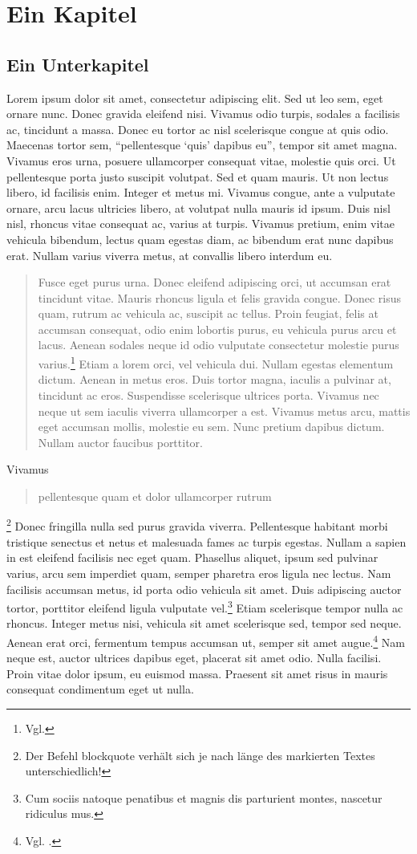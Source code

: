 \chapter{Ein Kapitel}
\section{Ein Unterkapitel}
Lorem ipsum dolor sit amet, consectetur adipiscing elit. Sed ut leo sem, eget ornare nunc. Donec gravida eleifend nisi. Vivamus odio turpis, sodales a facilisis ac, tincidunt a massa. Donec eu tortor ac nisl scelerisque congue at quis odio. Maecenas tortor sem, \enquote{pellentesque \enquote{quis} dapibus eu}, tempor sit amet magna. Vivamus eros urna, posuere ullamcorper consequat vitae, molestie quis orci. Ut pellentesque porta justo suscipit volutpat. Sed et quam mauris. Ut non lectus libero, id facilisis enim. Integer et metus mi. Vivamus congue, ante a vulputate ornare, arcu lacus ultricies libero, at volutpat nulla mauris id ipsum. Duis nisl nisl, rhoncus vitae consequat ac, varius at turpis. Vivamus pretium, enim vitae vehicula bibendum, lectus quam egestas diam, ac bibendum erat nunc dapibus erat. Nullam varius viverra metus, at convallis libero interdum eu.
\blockquote{Fusce eget purus urna. Donec eleifend adipiscing orci, ut accumsan erat tincidunt vitae. Mauris rhoncus ligula et felis gravida congue. Donec risus quam, rutrum ac vehicula ac, suscipit ac tellus. Proin feugiat, felis at accumsan consequat, odio enim lobortis purus, eu vehicula purus arcu et lacus. Aenean sodales neque id odio vulputate consectetur molestie purus varius.\footnote{Vgl. } Etiam a lorem orci, vel vehicula dui. Nullam egestas elementum dictum. Aenean in metus eros. Duis tortor magna, iaculis a pulvinar at, tincidunt ac eros. Suspendisse scelerisque ultrices porta. Vivamus nec neque ut sem iaculis viverra ullamcorper a est. Vivamus metus arcu, mattis eget accumsan mollis, molestie eu sem. Nunc pretium dapibus dictum. Nullam auctor faucibus porttitor.}
Vivamus \blockquote{pellentesque quam et dolor ullamcorper rutrum}.\footnote{Der Befehl blockquote verhält sich je nach länge des markierten Textes unterschiedlich!} Donec fringilla nulla sed purus gravida viverra. Pellentesque habitant morbi tristique senectus et netus et malesuada fames ac turpis egestas. Nullam a sapien in est eleifend facilisis nec eget quam. Phasellus aliquet, ipsum sed pulvinar varius, arcu sem imperdiet quam, semper pharetra eros ligula nec lectus. Nam facilisis accumsan metus, id porta odio vehicula sit amet. Duis adipiscing auctor tortor, porttitor eleifend ligula vulputate vel.\footnote{Cum sociis natoque penatibus et magnis dis parturient montes, nascetur ridiculus mus.} Etiam scelerisque tempor nulla ac rhoncus. Integer metus nisi, vehicula sit amet scelerisque sed, tempor sed neque. Aenean erat orci, fermentum tempus accumsan ut, semper sit amet augue.\footnote{Vgl. .} Nam neque est, auctor ultrices dapibus eget, placerat sit amet odio. Nulla facilisi. Proin vitae dolor ipsum, eu euismod massa. Praesent sit amet risus in mauris consequat condimentum eget ut nulla.

